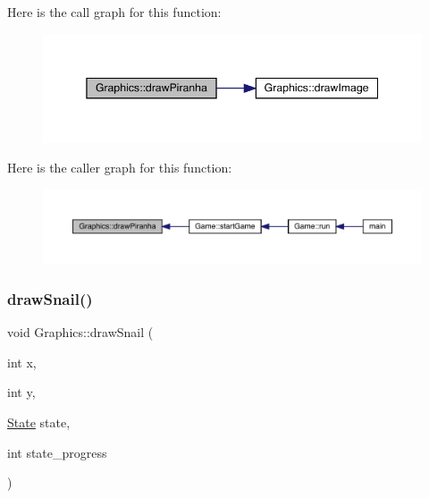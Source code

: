 Here is the call graph for this function\+:\nopagebreak
\begin{figure}[H]
\begin{center}
\leavevmode
\includegraphics[width=345pt]{class_graphics_a2b8425428b81e566f960928fa42133b6_cgraph}
\end{center}
\end{figure}
Here is the caller graph for this function\+:\nopagebreak
\begin{figure}[H]
\begin{center}
\leavevmode
\includegraphics[width=350pt]{class_graphics_a2b8425428b81e566f960928fa42133b6_icgraph}
\end{center}
\end{figure}
\mbox{\label{class_graphics_afce4453a05a511f4f07164d91c4ee2bf}} 
\subsubsection{\texorpdfstring{draw\+Snail()}{drawSnail()}}
{\footnotesize\ttfamily void Graphics\+::draw\+Snail (\begin{DoxyParamCaption}\item[{int}]{x,  }\item[{int}]{y,  }\item[{\mbox{\hyperlink{_constants_8hpp_a5d74787dedbc4e11c1ab15bf487e61f8}{State}}}]{state,  }\item[{int}]{state\+\_\+progress }\end{DoxyParamCaption})}


